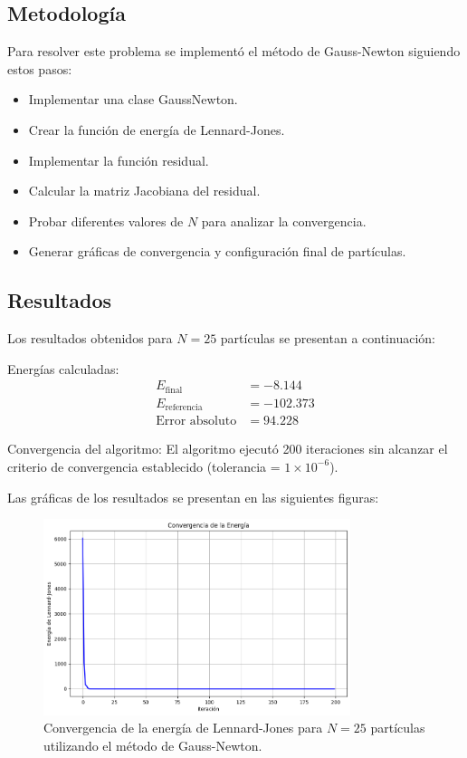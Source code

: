 \documentclass{article}
\begin{document}
\subsection{Metodología}

Para resolver este problema se implementó el método de Gauss-Newton siguiendo estos pasos:

\begin{itemize}
    \item Implementar una clase GaussNewton.
    \item Crear la función de energía de Lennard-Jones.
    \item Implementar la función residual.
    \item Calcular la matriz Jacobiana del residual.
    \item Probar diferentes valores de $N$ para analizar la convergencia.
    \item Generar gráficas de convergencia y configuración final de partículas.
\end{itemize}

\subsection{Resultados}
\setcounter{equation}{0}

Los resultados obtenidos para $N = 25$ partículas se presentan a continuación:

Energías calculadas:
\begin{align}
    E_{\text{final}} &= -8.144 \\
    E_{\text{referencia}} &= -102.373 \\
    \text{Error absoluto} &= 94.228
\end{align}

Convergencia del algoritmo:
El algoritmo ejecutó 200 iteraciones sin alcanzar el criterio de convergencia establecido (tolerancia = $1 \times 10^{-6}$).

Las gráficas de los resultados se presentan en las siguientes figuras:

\begin{figure}[H]
    \centering
    \includegraphics[width=0.8\textwidth]{images/9_descenso.png}
    \caption{Convergencia de la energía de Lennard-Jones para $N=25$ partículas utilizando el método de Gauss-Newton.}
\end{figure}
\end{document}
